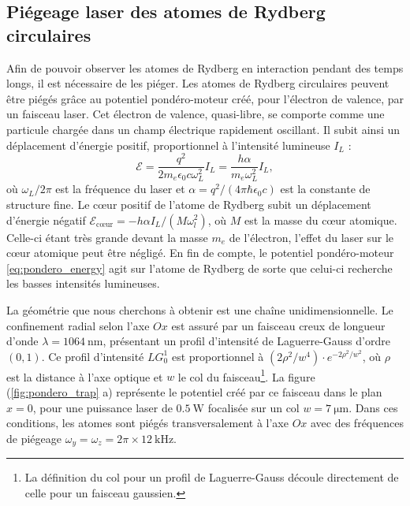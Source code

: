 	\subsection{Piégeage laser des atomes de Rydberg circulaires}\label{subsec:circ_laser_trapping}
\noindent Afin de pouvoir observer les atomes de Rydberg en interaction pendant des temps longs, il est nécessaire de les piéger.
Les atomes de Rydberg circulaires peuvent être piégés grâce au potentiel pondéro-moteur créé, pour l'électron de valence, par un faisceau laser.
Cet électron de valence, quasi-libre, se comporte comme une particule chargée dans un champ électrique rapidement oscillant.
Il subit ainsi un déplacement d'énergie positif, proportionnel à l'intensité lumineuse $I_L$ \cite{MX_FABRERYDHF76} :
\begin{equation}
\label{eq:pondero_energy}
\mathcal{E} = \frac{q^2}{2m_e \epsilon_0 c \omega_L^2} I_L
= \frac{h\alpha}{m_e\omega_L^2}I_L,
\end{equation}
où $\omega_L/2\pi$ est la fréquence du laser et $\alpha = q^2/(4\pi\hbar\epsilon_0 c)$ est la constante de structure fine.
Le c\oe ur positif de l'atome de Rydberg subit un déplacement d'énergie négatif $\mathcal{E}_{\text{c\oe ur}} = - h\alpha I_L/(M\omega_l^2)$, où $M$ est la masse du c\oe ur atomique.
Celle-ci étant très grande devant la masse $m_e$ de l'électron, l'effet du laser sur le c\oe ur atomique peut être négligé.
En fin de compte, le potentiel pondéro-moteur \eqref{eq:pondero_energy} agit sur l'atome de Rydberg de sorte que celui-ci recherche les basses intensités lumineuses.

La géométrie que nous cherchons à obtenir est une chaîne unidimensionnelle.
Le confinement radial selon l'axe $Ox$ est assuré par un faisceau \og creux \fg{} de longueur d'onde $\lambda=\SI{1064}{\nano\meter}$, présentant un profil d'intensité de Laguerre-Gauss d'ordre $(0,1)$.
Ce profil d'intensité $LG_0^1$ est proportionnel à $(2\rho^2/w^4)\cdot e^{-2\rho^2/w^2}$, où $\rho$ est la distance à l'axe optique et $w$ le col du faisceau\footnote{
La définition du col pour un profil de Laguerre-Gauss découle directement de celle pour un faisceau gaussien.
}.
La figure (\ref{fig:pondero_trap} a) représente le potentiel créé par ce faisceau dans le plan $x=0$, pour une puissance laser de $\SI{0.5}{\watt}$ focalisée sur un col $w=\SI{7}{\um}$.
Dans ces conditions, les atomes sont piégés transversalement à l'axe $Ox$ avec des fréquences de piégeage $\omega_y=\omega_z= 2\pi\times \SI{12}{\kHz}$.

